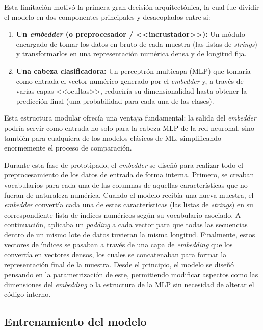 Esta limitación motivó la primera gran decisión arquitectónica, la cual fue dividir el modelo en dos componentes principales y desacoplados entre si:

\begin{enumerate}
	\item \textbf{Un \textit{embedder} (o preprocesador / <<incrustador>>):} Un módulo encargado de tomar los datos en bruto de cada muestra (las listas de \textit{strings}) y transformarlos en una representación numérica densa y de longitud fija.
	
	\item \textbf{Una cabeza clasificadora:} Un perceptrón multicapa (MLP) que tomaría como entrada el vector numérico generado por el \textit{embedder} y, a través de varias capas <<ocultas>>, reduciría su dimensionalidad hasta obtener la predicción final (una probabilidad para cada una de las clases).
\end{enumerate}

Esta estructura modular ofrecía una ventaja fundamental: la salida del \textit{embedder} podría servir como entrada no solo para la cabeza MLP de la red neuronal, sino también para cualquiera de los modelos clásicos de ML, simplificando enormemente el proceso de comparación.

Durante esta fase de prototipado, el \textit{embedder} se diseñó para realizar todo el preprocesamiento de los datos de entrada de forma interna. Primero, se creaban vocabularios para cada una de las columnas de aquellas características que no fueran de naturaleza numérica. Cuando el modelo recibía una nueva muestra, el \textit{embedder} convertía cada una de estas características (las listas de \textit{strings}) en su correspondiente lista de índices numéricos según su vocabulario asociado. A continuación, aplicaba un \textit{padding} a cada vector para que todas las secuencias dentro de un mismo lote de datos tuvieran la misma longitud. Finalmente, estos vectores de índices se pasaban a través de una capa de \textit{embedding} que los convertía en vectores densos, los cuales se concatenaban para formar la representación final de la muestra. Desde el principio, el modelo se diseñó pensando en la parametrización de este, permitiendo modificar aspectos como las dimensiones del \textit{embedding} o la estructura de la MLP sin necesidad de alterar el código interno.

\subsection{Entrenamiento del modelo}

